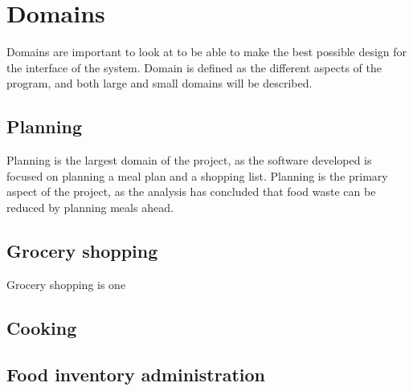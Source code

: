 \section{Domains}

Domains are important to look at to be able to make the best possible design for the interface of the system. Domain is defined as the different aspects of the program, and both large and small domains will be described.

\subsection{Planning}

Planning is the largest domain of the project, as the software developed is focused on planning a meal plan and a shopping list. Planning is the primary aspect of the project, as the analysis has concluded that food waste can be reduced by planning meals ahead.

\subsection{Grocery shopping}

Grocery shopping is one 

\subsection{Cooking}
\subsection{Food inventory administration}